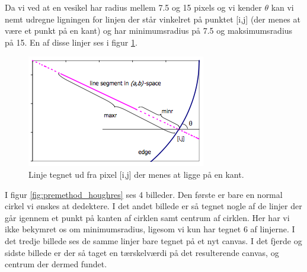 Da vi ved at en vesikel har radius mellem 7.5 og 15 pixels og vi kender $\theta$ kan vi nemt udregne ligningen for linjen der står vinkelret på punktet [i,j] (der menes at være et punkt på en kant) og har minimumsradius på 7.5 og maksimumsradius på 15. En af disse linjer ses i figur \ref{fig:premethod_houghLines}. 

\begin{figure}[H]
	\centering
	\includegraphics[scale=1]{files/premethod/img/hough_lines.png}
	\caption{Linje tegnet ud fra pixel [i,j] der menes at ligge på en kant.\label{fig:premethod_houghLines}}
\end{figure}

I figur \ref{fig:premethod_houghres} ses 4 billeder. Den første er bare en normal cirkel vi ønskes at dedektere. I det andet billede er så tegnet nogle af de linjer der går igennem et punkt på kanten af cirklen samt centrum af cirklen. Her har vi ikke bekymret os om minimumsradius, ligesom vi kun har tegnet 6 af linjerne. I det tredje billede ses de samme linjer bare tegnet på et nyt canvas. I det fjerde og sidste billede er der så taget en tærskelværdi på det resulterende canvas, og centrum der dermed fundet.

